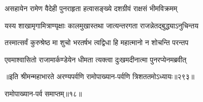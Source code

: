 \twolineshloka
{असहायेन रामेण वैदेही पुनराहृता}
{हत्वासङ्ख्ये दशग्रीवं राक्षसं भीमविक्रमम्}


\twolineshloka
{यस्य शाखामृगामित्राण्यृक्षाः कालमुखास्तथा}
{जात्यन्तरगता राजन्नेतद्बुद्ध्याऽनुचिन्तय}


\twolineshloka
{तस्मात्सर्वं कुरुश्रेष्ठ मा शुचो भरतर्षभ}
{त्वद्विधा हि महात्मानो न शोचन्ति परन्तप}



\twolineshloka
{एवमाश्वासितो राजामार्कण्डेयेन धीमता}
{त्यक्त्वा दुःखमदीनात्मा पुनरप्येनमब्रवीत्}


॥इति श्रीमन्महाभारते अरण्यपर्वणि रामोपाख्यान-पर्वणि त्रिशततमोऽध्यायः॥२९३॥

रामोपाख्यान-पर्व समाप्तम्॥१८॥ 

\closesection